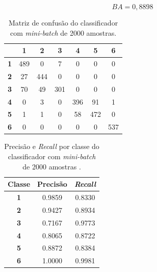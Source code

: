 \begin{equation}\label{eq:ba_lr_2000}
BA = 0,8898
\end{equation}

\begin{table}[H]
\centering
\begin{tabular}{c||c|c|c|c|c|c|}
	\cline{2-7}
	& \textbf{1} & \textbf{2} & \textbf{3} & \textbf{4} & \textbf{5} & \textbf{6} \\ \hline\hline
	\multicolumn{1}{|c||}{\textbf{1}} & 489        & 0          & 7          & 0          & 0          & 0          \\ \hline
	\multicolumn{1}{|c||}{\textbf{2}} & 27         & 444        & 0          & 0          & 0          & 0          \\ \hline
	\multicolumn{1}{|c||}{\textbf{3}} & 70         & 49         & 301        & 0          & 0          & 0          \\ \hline
	\multicolumn{1}{|c||}{\textbf{4}} & 0          & 3          & 0          & 396        & 91         & 1          \\ \hline
	\multicolumn{1}{|c||}{\textbf{5}} & 1          & 1          & 0          & 58         & 472        & 0          \\ \hline
	\multicolumn{1}{|c||}{\textbf{6}} & 0          & 0          & 0          & 0          & 0          & 537        \\ \hline
\end{tabular}
\caption{Matriz de confusão do classificador com \textit{mini-batch} de 2000 amostras.}
\label{tab:mc_lr_2000}
\end{table}

\begin{table}[H]
\centering
\begin{tabular}{c|c|c}
	\textbf{Classe} & \textbf{Precisão} & \textit{\textbf{Recall}} \\ \hline
	\textbf{1}      & 0.9859            & 0.8330                   \\
	\textbf{2}      & 0.9427            & 0.8934                   \\
	\textbf{3}      & 0.7167            & 0.9773                   \\
	\textbf{4}      & 0.8065            & 0.8722                   \\
	\textbf{5}      & 0.8872            & 0.8384                   \\
	\textbf{6}      & 1.0000            & 0.9981                  
\end{tabular}
\caption{Precisão e \textit{Recall} por classe do classificador com \textit{mini-batch} de 2000 amostras .}
\label{tab:pr_lr_2000}
\end{table}

